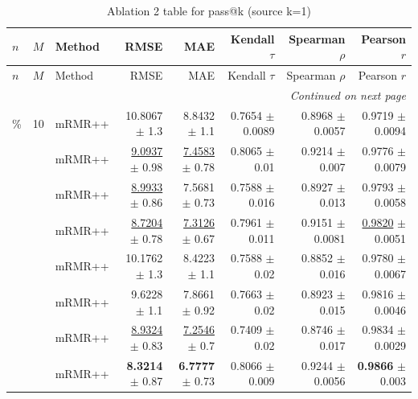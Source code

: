 \footnotesize
\setlength{\tabcolsep}{2pt}
\renewcommand{\arraystretch}{1.05}
\setlength{\LTpre}{0pt}
\setlength{\LTpost}{0pt}
\setlength{\LTleft}{\fill}
\setlength{\LTright}{\fill}
\begin{longtable}{llp{}rrrrr}
\caption{Ablation 2 table for pass@k (source k=1)}\label{tab:ablation\_2\_passk\_k1}\\
\toprule
$n$ & $M$ & Method & RMSE & MAE & Kendall $\tau$ & Spearman $\rho$ & Pearson $r$ \\
\midrule
\endfirsthead
\toprule
$n$ & $M$ & Method & RMSE & MAE & Kendall $\tau$ & Spearman $\rho$ & Pearson $r$ \\
\midrule
\endhead
\midrule
\multicolumn{8}{r}{\emph{Continued on next page}} \\
\midrule
\endfoot
\bottomrule
\endlastfoot
5\% & 10 & mRMR++ & 10.8067 {\scriptsize $\pm$ 1.3} & 8.8432 {\scriptsize $\pm$ 1.1} & 0.7654 {\scriptsize $\pm$ 0.0089} & 0.8968 {\scriptsize $\pm$ 0.0057} & 0.9719 {\scriptsize $\pm$ 0.0094} \\
 &  & mRMR++ & \underline{9.0937} {\scriptsize $\pm$ 0.98} & \underline{7.4583} {\scriptsize $\pm$ 0.78} & 0.8065 {\scriptsize $\pm$ 0.01} & 0.9214 {\scriptsize $\pm$ 0.007} & 0.9776 {\scriptsize $\pm$ 0.0079} \\
 &  & mRMR++ & \underline{8.9933} {\scriptsize $\pm$ 0.86} & 7.5681 {\scriptsize $\pm$ 0.73} & 0.7588 {\scriptsize $\pm$ 0.016} & 0.8927 {\scriptsize $\pm$ 0.013} & 0.9793 {\scriptsize $\pm$ 0.0058} \\
 &  & mRMR++ & \underline{8.7204} {\scriptsize $\pm$ 0.78} & \underline{7.3126} {\scriptsize $\pm$ 0.67} & 0.7961 {\scriptsize $\pm$ 0.011} & 0.9151 {\scriptsize $\pm$ 0.0081} & \underline{0.9820} {\scriptsize $\pm$ 0.0051} \\
 &  & mRMR++ & 10.1762 {\scriptsize $\pm$ 1.3} & 8.4223 {\scriptsize $\pm$ 1.1} & 0.7588 {\scriptsize $\pm$ 0.02} & 0.8852 {\scriptsize $\pm$ 0.016} & 0.9780 {\scriptsize $\pm$ 0.0067} \\
 &  & mRMR++ & 9.6228 {\scriptsize $\pm$ 1.1} & 7.8661 {\scriptsize $\pm$ 0.92} & 0.7663 {\scriptsize $\pm$ 0.02} & 0.8923 {\scriptsize $\pm$ 0.015} & 0.9816 {\scriptsize $\pm$ 0.0046} \\
 &  & mRMR++ & \underline{8.9324} {\scriptsize $\pm$ 0.83} & \underline{7.2546} {\scriptsize $\pm$ 0.7} & 0.7409 {\scriptsize $\pm$ 0.02} & 0.8746 {\scriptsize $\pm$ 0.017} & 0.9834 {\scriptsize $\pm$ 0.0029} \\
 &  & mRMR++ & \textbf{8.3214} {\scriptsize $\pm$ 0.87} & \textbf{6.7777} {\scriptsize $\pm$ 0.73} & 0.8066 {\scriptsize $\pm$ 0.009} & 0.9244 {\scriptsize $\pm$ 0.0056} & \textbf{0.9866} {\scriptsize $\pm$ 0.003} \\

\end{longtable}
